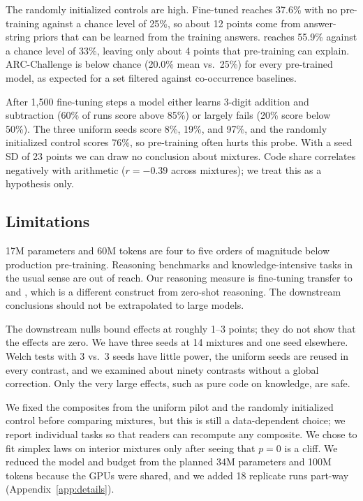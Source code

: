 The randomly initialized controls are high.
Fine-tuned \sciq reaches 37.6\% with no pre-training against a chance level of 25\%, so about 12 points come from answer-string priors that can be learned from the \sciq training answers.
\proofwriter reaches 55.9\% against a chance level of 33\%, leaving only about 4 points that pre-training can explain.
ARC-Challenge is below chance (20.0\% mean vs.\ 25\%) for every pre-trained model, as expected for a set filtered against co-occurrence baselines.

After 1{,}500 fine-tuning steps a model either learns 3-digit addition and subtraction (60\% of runs score above 85\%) or largely fails (20\% score below 50\%).
The three uniform seeds score 8\%, 19\%, and 97\%, and the randomly initialized control scores 76\%, so pre-training often hurts this probe.
With a seed SD of 23 points we can draw no conclusion about mixtures.
Code share correlates negatively with arithmetic ($r = -0.39$ across mixtures); we treat this as a hypothesis only.

\subsection{Limitations}
\label{sec:limitations}

17M parameters and 60M tokens are four to five orders of magnitude below production pre-training.
Reasoning benchmarks and knowledge-intensive tasks in the usual sense are out of reach.
Our reasoning measure is fine-tuning transfer to \listops and \proofwriter, which is a different construct from zero-shot reasoning.
The downstream conclusions should not be extrapolated to large models.

The downstream nulls bound effects at roughly 1--3 points; they do not show that the effects are zero.
We have three seeds at 14 mixtures and one seed elsewhere.
Welch tests with 3 vs.\ 3 seeds have little power, the uniform seeds are reused in every contrast, and we examined about ninety contrasts without a global correction.
Only the very large effects, such as pure code on knowledge, are safe.

We fixed the composites from the uniform pilot and the randomly initialized control before comparing mixtures, but this is still a data-dependent choice; we report individual tasks so that readers can recompute any composite.
We chose to fit simplex laws on interior mixtures only after seeing that $p = 0$ is a cliff.
We reduced the model and budget from the planned 34M parameters and 100M tokens because the GPUs were shared, and we added 18 replicate runs part-way (Appendix~\ref{app:details}).

